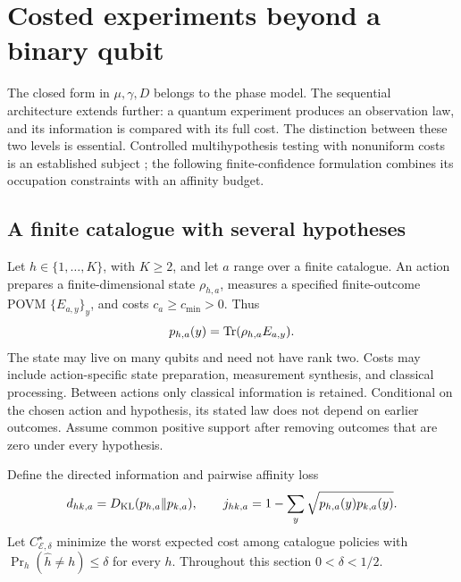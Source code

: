 \section{Costed experiments beyond a binary qubit}
\label{sec:general-costed}
The closed form in $\mu,\gamma,D$ belongs to the phase model. The
sequential architecture extends further: a quantum experiment produces
an observation law, and its information is compared with its full cost.
The distinction between these two levels is essential. Controlled
multihypothesis testing with nonuniform costs is an established subject
\citep{chernoff1959,nitinawarat2015}; the following finite-confidence
formulation combines its occupation constraints with an affinity budget.

\subsection{A finite catalogue with several hypotheses}
Let $h\in\{1,\ldots,K\}$, with $K\geq2$, and let $a$ range over a finite catalogue.
An action prepares a finite-dimensional state $\rho_{h,a}$, measures
a specified finite-outcome POVM $\{E_{a,y}\}_y$, and costs $c_a\geq c_{\min}>0$.
Thus
\[
 p_{h,a}(y)=\operatorname{Tr}(\rho_{h,a}E_{a,y}).
\]
The state may live on many qubits and need not have rank two. Costs may
include action-specific state preparation, measurement synthesis, and
classical processing. Between actions only classical information is
retained. Conditional on the chosen action and hypothesis, its stated
law does not depend on earlier outcomes. Assume common positive support
after removing outcomes that are zero under every hypothesis.

Define the directed information and pairwise affinity loss
\begin{equation}\label{eq:catalogue-information}
 d_{hk,a}=D_{\rm KL}(p_{h,a}\|p_{k,a}),\qquad
 j_{hk,a}=1-\sum_y\sqrt{p_{h,a}(y)p_{k,a}(y)}.
\end{equation}
Let $C_{\mathcal E,\delta}^\star$ minimize the worst expected cost among
catalogue policies with $\Pr_h(\widehat h\ne h)\leq\delta$ for every $h$.
Throughout this section $0<\delta<1/2$.

